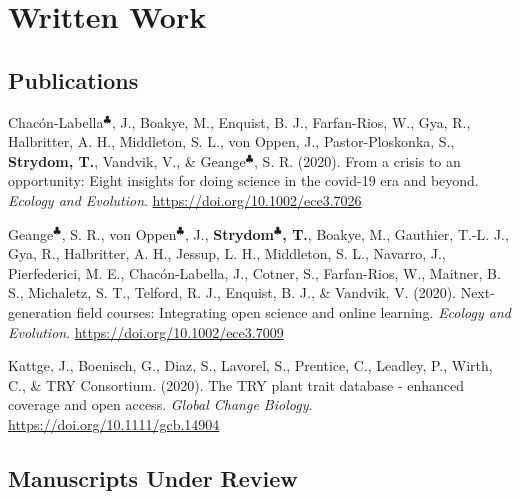 \documentclass[11pt, a4paper]{awesome-cv}
\begin{document}
\newpage

\hypertarget{written-work}{%
\section{Written Work}\label{written-work}}

\vspace{\baselineskip}

\hypertarget{publications}{%
\subsection{\texorpdfstring{\textbf{Publications}}{Publications}}\label{publications}}

\begingroup
\setlength{\parindent}{-0.5in}
\setlength{\leftskip}{0.5in}

\hypertarget{refs_journals}{}
\leavevmode\hypertarget{ref-Chac_2020}{}%
Chacón-Labella\(^\clubsuit\), J., Boakye, M., Enquist, B. J., Farfan-Rios, W., Gya, R., Halbritter, A. H., Middleton, S. L., von Oppen, J., Pastor-Ploskonka, S., \textbf{Strydom, T.}, Vandvik, V., \& Geange\(^\clubsuit\), S. R. (2020). From a crisis to an opportunity: Eight insights for doing science in the covid-19 era and beyond. \emph{Ecology and Evolution}. \url{https://doi.org/10.1002/ece3.7026}

\leavevmode\hypertarget{ref-Geange_2020}{}%
Geange\(^\clubsuit\), S. R., von Oppen\(^\clubsuit\), J., \textbf{Strydom\(^\clubsuit\), T.}, Boakye, M., Gauthier, T.-L. J., Gya, R., Halbritter, A. H., Jessup, L. H., Middleton, S. L., Navarro, J., Pierfederici, M. E., Chacón-Labella, J., Cotner, S., Farfan-Rios, W., Maitner, B. S., Michaletz, S. T., Telford, R. J., Enquist, B. J., \& Vandvik, V. (2020). Next-generation field courses: Integrating open science and online learning. \emph{Ecology and Evolution}. \url{https://doi.org/10.1002/ece3.7009}

\leavevmode\hypertarget{ref-Kattge_2020}{}%
Kattge, J., Boenisch, G., Diaz, S., Lavorel, S., Prentice, C., Leadley, P., Wirth, C., \& TRY Consortium. (2020). The TRY plant trait database - enhanced coverage and open access. \emph{Global Change Biology}. \url{https://doi.org/10.1111/gcb.14904}

\endgroup
\vspace{\baselineskip}

\hypertarget{manuscripts-under-review}{%
\subsection{\texorpdfstring{\textbf{Manuscripts Under Review}}{Manuscripts Under Review}}\label{manuscripts-under-review}}
\end{document}
